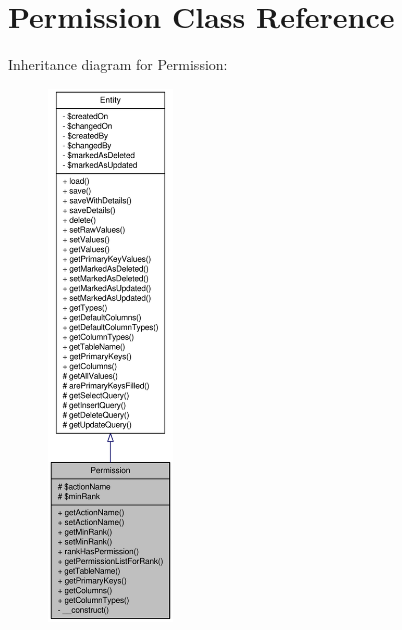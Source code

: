 \hypertarget{classPermission}{
\section{Permission Class Reference}
\label{classPermission}
}


Inheritance diagram for Permission:\nopagebreak
\begin{figure}[H]
\begin{center}
\leavevmode
\includegraphics[height=400pt]{classPermission__inherit__graph}
\end{center}
\end{figure}


